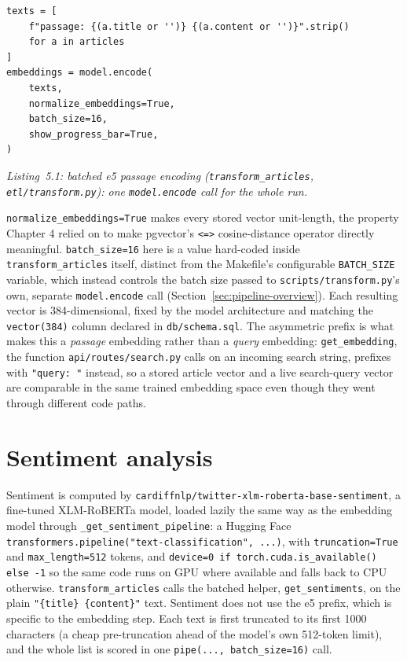 \begin{verbatim}
texts = [
    f"passage: {(a.title or '')} {(a.content or '')}".strip()
    for a in articles
]
embeddings = model.encode(
    texts,
    normalize_embeddings=True,
    batch_size=16,
    show_progress_bar=True,
)
\end{verbatim}
\begin{center}
\textit{Listing~5.1: batched e5 passage encoding (\texttt{transform\_articles}, \texttt{etl/\allowbreak transform.py}): one \texttt{model.encode} call for the whole run.}
\end{center}

\texttt{normalize\_embeddings=True} makes every stored vector unit-length, the property Chapter 4 relied on to make pgvector's \texttt{<=>} cosine-distance operator directly meaningful. \texttt{batch\_size=16} here is a value hard-coded inside \texttt{transform\_articles} itself, distinct from the Makefile's configurable \texttt{BATCH\_SIZE} variable, which instead controls the batch size passed to \texttt{scripts/\allowbreak transform.py}'s own, separate \texttt{model.encode} call (Section~\ref{sec:pipeline-overview}). Each resulting vector is 384-dimensional, fixed by the model architecture and matching the \texttt{vector(384)} column declared in \texttt{db/schema.sql}. The asymmetric prefix is what makes this a \emph{passage} embedding rather than a \emph{query} embedding: \texttt{get\_embedding}, the function \texttt{api/routes/search.py} calls on an incoming search string, prefixes with \texttt{"query: "} instead, so a stored article vector and a live search-query vector are comparable in the same trained embedding space even though they went through different code paths.

\section{Sentiment analysis}
\label{sec:sentiment}
\begin{sloppypar}
Sentiment is computed by \texttt{cardiffnlp/\allowbreak twitter-xlm-roberta-\allowbreak base-sentiment}, a fine-tuned XLM-RoBERTa model, loaded lazily the same way as the embedding model through \texttt{\_get\_\allowbreak sentiment\_pipeline}: a Hugging Face \texttt{transformers.pipeline("text-classification", ...)}, with \texttt{truncation=True} and \texttt{max\_length=512} tokens, and \texttt{device=0 if torch.cuda.is\_available() else -1} so the same code runs on GPU where available and falls back to CPU otherwise. \texttt{transform\_articles} calls the batched helper, \texttt{get\_sentiments}, on the plain \texttt{"\{title\} \{content\}"} text. Sentiment does not use the e5 prefix, which is specific to the embedding step. Each text is first truncated to its first 1000 characters (a cheap pre-truncation ahead of the model's own 512-token limit), and the whole list is scored in one \texttt{pipe(..., batch\_size=16)} call.
\end{sloppypar}

